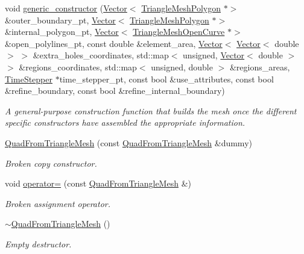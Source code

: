 \begin{DoxyCompactItemize}
void \hyperlink{classoomph_1_1QuadFromTriangleMesh_ae2036525cc3a3b2bdd8edfa01783a303}{generic\+\_\+constructor} (\hyperlink{classoomph_1_1Vector}{Vector}$<$ \hyperlink{classoomph_1_1TriangleMeshPolygon}{Triangle\+Mesh\+Polygon} $\ast$$>$ \&outer\+\_\+boundary\+\_\+pt, \hyperlink{classoomph_1_1Vector}{Vector}$<$ \hyperlink{classoomph_1_1TriangleMeshPolygon}{Triangle\+Mesh\+Polygon} $\ast$$>$ \&internal\+\_\+polygon\+\_\+pt, \hyperlink{classoomph_1_1Vector}{Vector}$<$ \hyperlink{classoomph_1_1TriangleMeshOpenCurve}{Triangle\+Mesh\+Open\+Curve} $\ast$$>$ \&open\+\_\+polylines\+\_\+pt, const double \&element\+\_\+area, \hyperlink{classoomph_1_1Vector}{Vector}$<$ \hyperlink{classoomph_1_1Vector}{Vector}$<$ double $>$ $>$ \&extra\+\_\+holes\+\_\+coordinates, std\+::map$<$ unsigned, \hyperlink{classoomph_1_1Vector}{Vector}$<$ double $>$ $>$ \&regions\+\_\+coordinates, std\+::map$<$ unsigned, double $>$ \&regions\+\_\+areas, \hyperlink{classoomph_1_1TimeStepper}{Time\+Stepper} $\ast$time\+\_\+stepper\+\_\+pt, const bool \&use\+\_\+attributes, const bool \&refine\+\_\+boundary, const bool \&refine\+\_\+internal\+\_\+boundary)
\begin{DoxyCompactList}\small\item\em A general-\/purpose construction function that builds the mesh once the different specific constructors have assembled the appropriate information. \end{DoxyCompactList}\item 
\hyperlink{classoomph_1_1QuadFromTriangleMesh_adc45cf7389f505a2f05d477474b2dcbb}{Quad\+From\+Triangle\+Mesh} (const \hyperlink{classoomph_1_1QuadFromTriangleMesh}{Quad\+From\+Triangle\+Mesh} \&dummy)
\begin{DoxyCompactList}\small\item\em Broken copy constructor. \end{DoxyCompactList}\item 
void \hyperlink{classoomph_1_1QuadFromTriangleMesh_a873e7ed187ae267ad985e61e71e3b90c}{operator=} (const \hyperlink{classoomph_1_1QuadFromTriangleMesh}{Quad\+From\+Triangle\+Mesh} \&)
\begin{DoxyCompactList}\small\item\em Broken assignment operator. \end{DoxyCompactList}\item 
\hyperlink{classoomph_1_1QuadFromTriangleMesh_aa8737e7a7e845cab4fb6fd82c8f3506d}{$\sim$\+Quad\+From\+Triangle\+Mesh} ()
\begin{DoxyCompactList}\small\item\em Empty destructor. \end{DoxyCompactList}\item 
$$
\end{DoxyCompactItemize}

